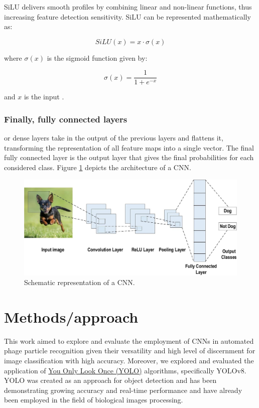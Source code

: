 \documentclass[runningheads]{llncs}
\begin{document}
SiLU delivers smooth profiles by combining linear and non-linear functions, thus increasing feature detection sensitivity. SiLU can be represented mathematically as:

\begin{equation}
    SiLU(x) = x \cdot \sigma(x)
\end{equation}

where $\sigma(x)$ is the sigmoid function given by:

\begin{equation}
    \sigma(x) = \frac{1}{1 + e^{-x}}
\end{equation}

and $x$ is the input \cite{elfwing2018}.

\subsubsection{Finally, fully connected layers} or dense layers take in the output of the previous layers and flattens it, transforming the representation of all feature maps into a single vector. The final fully connected layer is the output layer that gives the final probabilities for each considered class.  Figure \ref{fig4} depicts the architecture of a CNN. \cite{Alzubaidi2021}


\begin{figure}
\begin{center}
\includegraphics[width=.5\textwidth]{./figures/fig-4-cnn_repr.jpeg}
\caption{Schematic representation of a CNN. \cite{Alzubaidi2021}} \label{fig4}
\end{center}
\end{figure}


\section{Methods/approach}

This work aimed to explore and evaluate the employment of CNNs in automated phage particle recognition given their versatility and high level of discernment for image classification with high accuracy. \cite{ogura2004} Moreover,  we explored and evaluated the application of \href{https://docs.ultralytics.com/models/yolov8/}{You Only Look Once (YOLO)} algorithms, specifically YOLOv8. YOLO was created as an approach for object detection and has been demonstrating growing accuracy and real-time performance and have already been employed in the field of biological images processing. \cite{li2023,zhu2023,gonzalez2023}
\end{document}

